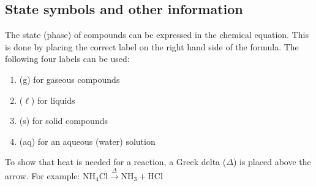          \subsection*{State symbols and other information}
    \nopagebreak
      \label{m38727*id65920}The state (phase) of compounds can be expressed in the chemical equation. This is done by placing the correct label on the right hand side of the formula. The following four labels can be used:\par \noindent 
      \label{m38727*id65925}\begin{enumerate}[noitemsep, label=\textbf{\arabic*}.] 
\item (g) for gaseous compounds
\label{m38727*uid28}\item ($\ell$) for liquids
\label{m38727*uid29}\item (s) for solid compounds
\label{m38727*uid30}\item (aq) for an aqueous (water) solution
\end{enumerate}
\label{m38727*eip-536}To show that heat is needed for a reaction, a Greek delta ($\Delta $) is placed above the arrow. For example: $\text{NH}_{4}\text{Cl} \xrightarrow{\Delta} \text{NH}_{3} + \text{HCl}$ 
\vspace{-.5cm}
\label{m38727*secfhsst!!!underscore!!!id967} 
      \noindent
